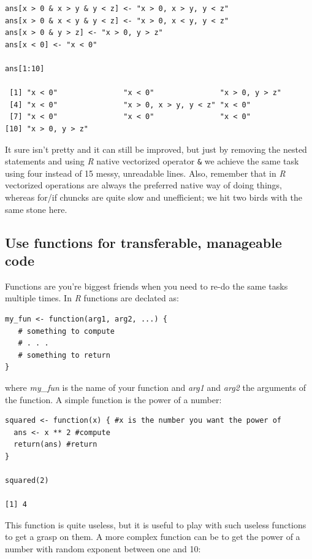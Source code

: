 \documentclass{book}
\begin{document}
\begin{lstlisting}[showstringspaces=false]
ans[x > 0 & x > y & y < z] <- "x > 0, x > y, y < z"
ans[x > 0 & x < y & y < z] <- "x > 0, x < y, y < z"
ans[x > 0 & y > z] <- "x > 0, y > z"
ans[x < 0] <- "x < 0"

ans[1:10]

 [1] "x < 0"               "x < 0"               "x > 0, y > z"       
 [4] "x < 0"               "x > 0, x > y, y < z" "x < 0"              
 [7] "x < 0"               "x < 0"               "x < 0"              
[10] "x > 0, y > z"   
\end{lstlisting}

It sure isn't pretty and it can still be improved, but just by removing the nested statements and using \textit{R} native vectorized operator \texttt{\&} we achieve the same task using four instead of 15 messy, unreadable lines. Also, remember that in \textit{R} vectorized operations are always the preferred native way of doing things, whereas for/if chuncks are quite slow and unefficient; we hit two birds with the same stone here.

\subsection{Use functions for transferable, manageable code}

Functions are you're biggest friends when you need to re-do the same tasks multiple times. In \textit{R} functions are declated as:

\begin{lstlisting}[showstringspaces=false]
my_fun <- function(arg1, arg2, ...) {
   # something to compute
   # . . . 
   # something to return
}
\end{lstlisting}

where \textit{my\_fun} is the name of your function and \textit{arg1} and \textit{arg2} the arguments of the function. A simple function is the power of a number:

\begin{lstlisting}[showstringspaces=false]
squared <- function(x) { #x is the number you want the power of
  ans <- x ** 2 #compute
  return(ans) #return
}

squared(2)

[1] 4
\end{lstlisting}

This function is quite useless, but it is useful to play with such useless functions to get a grasp on them. A more complex function can be to get the power of a number with random exponent between one and 10:
\end{document}
